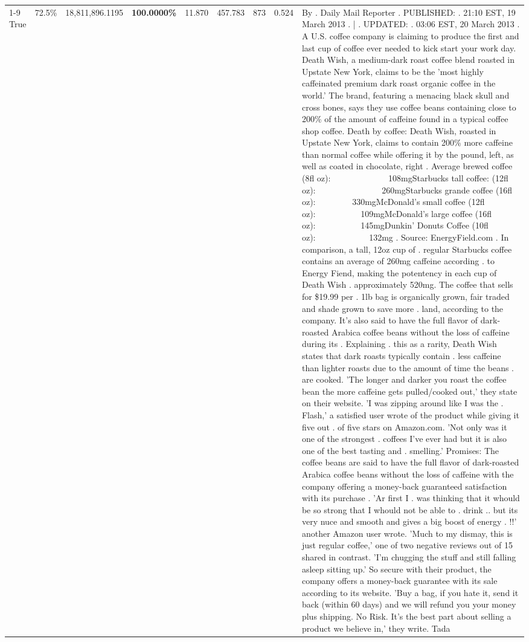 \begin{table}[H]
{\begin{tabular}{lllrlllll}
\cline{1-9}
True & 72.5\% & 18,811,896.1195 & \bfseries \color{red} 100.0000\% & 11.870 & 457.783 & 873 & 0.524 & By . Daily Mail Reporter . PUBLISHED: . 21:10 EST, 19 March 2013 . | . UPDATED: . 03:06 EST, 20 March 2013 . A U.S. coffee company is claiming to produce the first and last cup of coffee ever needed to kick start your work day. Death Wish, a medium-dark roast coffee blend roasted in Upstate New York, claims to be the 'most highly caffeinated premium dark roast organic coffee in the world.' The brand, featuring a menacing black skull and cross bones, says they use coffee beans containing close to 200\% of the amount of caffeine found in a typical coffee shop coffee. Death by coffee: Death Wish, roasted in Upstate New York, claims to contain 200\% more caffeine than normal coffee while offering it by the pound, left, as well as coated in chocolate, right . Average brewed coffee (8fl oz):              108mgStarbucks tall coffee: (12fl oz):                260mgStarbucks grande coffee (16fl oz):         330mgMcDonald's small coffee (12fl oz):           109mgMcDonald's large coffee (16fl oz):           145mgDunkin' Donuts Coffee (10fl oz):             132mg . Source: EnergyField.com . In comparison, a tall, 12oz cup of . regular Starbucks coffee contains an average of 260mg caffeine according . to Energy Fiend, making the potentency in each cup of Death Wish . approximately 520mg. The coffee that sells for \$19.99 per . 1lb bag is organically grown, fair traded and shade grown to save more . land, according to the company. It's also said to have the full flavor of dark-roasted Arabica coffee beans without the loss of caffeine during its . Explaining . this as a rarity, Death Wish states that dark roasts typically contain . less caffeine than lighter roasts due to the amount of time the beans . are cooked. 'The longer and darker you roast the coffee bean the more caffeine gets pulled/cooked out,' they state on their website. 'I was zipping around like I was the . Flash,' a satisfied user wrote of the product while giving it five out . of five stars on Amazon.com. 'Not only was it one of the strongest . coffees I've ever had but it is also one of the best tasting and . smelling.’ Promises: The coffee beans are said to have the full flavor of dark-roasted Arabica coffee beans without the loss of caffeine with the company offering a money-back guaranteed satisfaction with its purchase . 'Ar first I . was thinking that it whould be so strong that I whould not be able to . drink .. but its very nuce and smooth and gives a big boost of energy . !!' another Amazon user wrote. 'Much to my dismay, this is just regular coffee,' one of two negative reviews out of 15 shared in contrast. 'I'm chugging the stuff and still falling asleep sitting up.' So secure with their product, the company offers a money-back guarantee with its sale according to its website. 'Buy a bag, if you hate it, send it back (within 60 days) and we will refund you your money plus shipping. No Risk. It’s the best part about selling a product we believe in,' they write. Tada \\

\end{tabular}}
\end{table}
